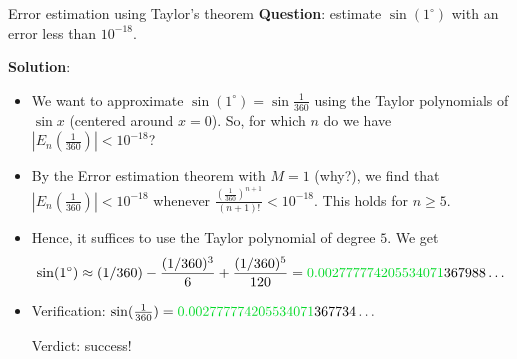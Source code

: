 \begin{frame}{Error estimation using Taylor's theorem}
    \textbf{Question}: estimate $\sin(1^\circ)$ with an error less than $10^{-18}$.

    \vspace{2mm}
    \pause
    \textbf{Solution}: 
    \begin{itemize}
        \pause\item We want to approximate $\sin(1^\circ)=\sin\frac1{360}$ using the Taylor polynomials of $\sin x$ (centered around $x=0$). So, for which $n$ do we have $|E_n(\frac1{360})|<10^{-18}$?

        \pause\item By the Error estimation theorem with $M=1$ (why?), we find that $|E_n(\frac1{360})|<10^{-18}$ whenever $\frac{(\frac1{360})^{n+1}}{(n+1)!}<10^{-18}$. This holds for $n\geq5$.

        \pause\item Hence, it suffices to use the Taylor polynomial of degree $5$. We get
            {\footnotesize\[\sin(1^\circ)\approx (1/360)-\frac{(1/360)^3}6+\frac{(1/360)^5}{120}={\color{green!70!teal}0.002777774205534071}367988\dots\]}

        \pause\item Verification: {\footnotesize$\sin(\frac1{360})={\color{green!70!teal}0.002777774205534071}367734\dots$}
        
            \pause
            Verdict: success!

        \end{itemize}
    
\end{frame}





